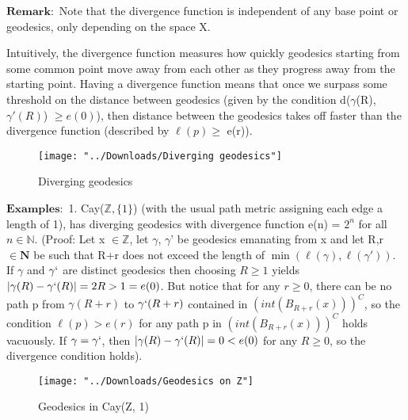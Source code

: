 \documentclass[11pt]{article}
\newcommand{\vs}{\vskip10pt}
\begin{document}
	$\mathbf{Remark:}$ Note that the divergence function is independent of any base point or geodesics, only depending on the space X. 
	
	\vs 
	
	Intuitively, the divergence function measures how quickly geodesics starting from some common point move away from each other as they progress away from the starting point. Having a divergence function means that once we surpass some threshold on the distance between geodesics (given by the condition d($\gamma$(R), $\gamma'(R)$) $\geq e(0)$), then distance between the geodesics takes off faster than the divergence function (described by $\ell (p) \geq $ e(r)).
	
		\begin{figure}[h]
		\centering
		\texttt{[image: "../Downloads/Diverging geodesics"]}
		\caption{Diverging geodesics}
		\label{Figure 1: Diverging geodesics}
		
	\end{figure}
	
	\vskip40pt
	$\mathbf{Examples:}$
	\vs
	1. Cay($\mathbb{Z}, \{1\}$) (with the usual path metric assigning each edge a length of 1), has diverging geodesics with divergence function e(n) = $2^n$ for all $n \in \mathbb{N}$.
	(Proof: Let x $\in \mathbb{Z}$, let $\gamma$, $\gamma$' be geodesics emanating from x and let R,r $\in \mathbf{N}$ be such that R+r does not exceed the length of $ \min(\ell(\gamma), \ell(\gamma'))$. If $\gamma$ and $\gamma`$ are distinct geodesics then choosing $R \geq 1$ yields $\vert \gamma(R) - \gamma`(R) \vert = 2R > 1 = e(0)$. But notice that for any $r \geq 0$, there can be no path p from $\gamma(R+r)$ to $\gamma`(R+r)$ contained in $(int(B_{R+r}(x)))^C$, so the condition $\ell(p) > e(r)$ for any path p in $(int(B_{R+r}(x)))^C$ holds vacuously. If $\gamma = \gamma`$, then $\vert \gamma(R) - \gamma`(R) \vert = 0 < e(0)$ for any $R \geq 0$, so the divergence condition holds).

		\begin{figure}[h]
		\centering
		\texttt{[image: "../Downloads/Geodesics on Z"]}
		\caption{Geodesics in Cay(Z, {1})}
		\label{Figure 2: Geodesics in Cay(Z, {1})}
		
	\end{figure}
	
\end{document}
